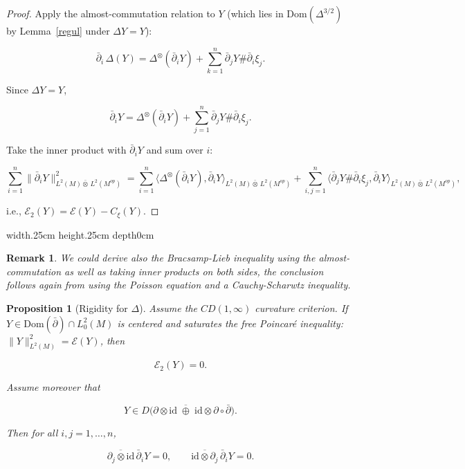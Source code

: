\documentclass[10pt,a4paper,reqno]{amsart}
\newtheorem{proposition}[theorem]{Proposition}
\newtheorem{remark}[theorem]{Remark}
\def\qed{ \hfill \vrule width.25cm height.25cm depth0cm\smallskip}
\newcommand{\Dom}{\mathrm{Dom}}
\begin{document}
\begin{proof}
Apply the almost-commutation relation to $Y$ (which lies in $\Dom(\Delta^{3/2})$ by Lemma~\ref{regul} under $\Delta Y=Y$):


\[
\bar\partial_i\,\Delta(Y)= \Delta^{\otimes}(\bar\partial_i Y) + \sum_{k=1}^n \bar\partial_j Y \# \bar\partial_i \xi_j.
\]


Since $\Delta Y=Y$,


\[
\bar\partial_i Y = \Delta^{\otimes}(\bar\partial_i Y) + \sum_{j=1}^n \bar\partial_j Y \# \bar\partial_i \xi_j.
\]


Take the inner product with $\bar\partial_i Y$ and sum over $i$:


\[
\sum_{i=1}^n \|\bar\partial_i Y\|^2_{L^2(M){\bar\otimes}\,L^2(M^{op})}
=\sum_{i=1}^n \langle \Delta^{\otimes}(\bar\partial_i Y),\bar\partial_i Y\rangle_{L^2(M){\bar\otimes}\,L^2(M^{op})}
+\sum_{i,j=1}^n \langle \bar\partial_j Y\# \bar\partial_i \xi_j,\bar\partial_i Y\rangle_{L^2(M){\bar\otimes}\,L^2(M^{op})},
\]


i.e., $\mathcal E_2(Y)=\mathcal{E}(Y)-C_\xi(Y)$.
\end{proof}
\qed
\begin{remark}
    We could derive also the Bracsamp-Lieb inequality using the almost-commutation as well as taking inner products on both sides, the conclusion follows again from using the Poisson equation and a Cauchy-Scharwtz inequality.
\end{remark}
\begin{proposition}[Rigidity for $\Delta$]\label{prop:Szero-Delta}
Assume the $CD(1,\infty)$ curvature criterion.
If $Y\in \Dom(\bar{\partial})\cap L^2_0(M)$ is centered and saturates the free Poincar\'e inequality: $
\|Y\|_{L^2(M)}^2=\mathcal{E}(Y)$, then


\[
\mathcal E_2(Y)=0.
\]



Assume moreover that


\[
Y\in D\!\big(\overline{{\partial}\otimes \mathrm{id}\;\oplus\;\mathrm{id}\otimes{\partial}}\circ\bar\partial \big).
\]


Then for all $i,j=1,\ldots,n$,


\[
\overline{\partial_j\otimes \mathrm{id}}\,\bar\partial_i Y=0,
\qquad
\overline{\mathrm{id}\otimes \partial_j}\,\bar\partial_i Y=0.
\]


\end{proposition}
\end{document}
